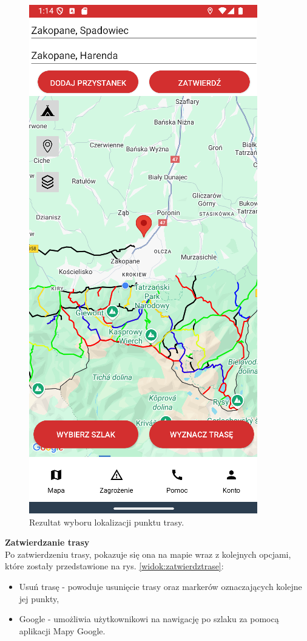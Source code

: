 \begin{figure}[H]
    \centering
    \includegraphics[scale=0.6]{img/imp/widok-pkt.png}
    \caption{Rezultat wyboru lokalizacji punktu trasy.}
    \label{widok:ustawlokalizacjewynik}
\end{figure}

\noindent
\textbf{Zatwierdzanie trasy} \\
\indent Po zatwierdzeniu trasy, pokazuje się ona na mapie wraz z kolejnych opcjami, które zostały przedstawione na rys. \ref{widok:zatwierdztrase}:
\begin{itemize}
    \item Usuń trasę - powoduje usunięcie trasy oraz markerów oznaczających kolejne jej punkty,
    \item Google - umożliwia użytkownikowi na nawigację po szlaku za pomocą aplikacji Mapy Google.\\
\end{itemize}

